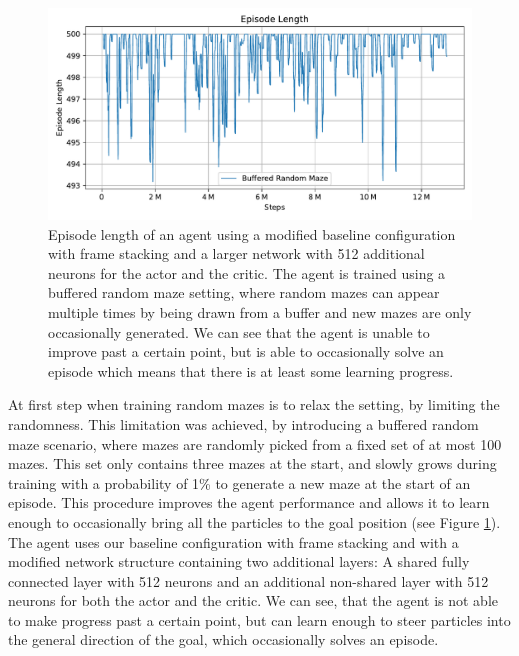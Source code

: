 \begin{figure}[htp]
    \begin{center}
        \includegraphics[clip, width=0.9\columnwidth]{figures/evaluation/randomness/instances/buffered_random_ep_len.pdf}
    \end{center}
    \caption[Episode Length on the Buffered Random Maze]{Episode length of an agent using a modified baseline configuration with frame stacking and a larger network with 512 additional neurons for the actor and the critic. The agent is trained using a buffered random maze setting, where random mazes can appear multiple times by being drawn from a buffer and new mazes are only occasionally generated. We can see that the agent is unable to improve past a certain point, but is able to occasionally solve an episode which means that there is at least some learning progress.} \label{fig:Eval/RandomInstance/Buffered}
\end{figure}

At first step when training random mazes is to relax the setting, by limiting the randomness. This limitation was achieved, by introducing a buffered random maze scenario, where mazes are randomly picked from a fixed set of at most 100 mazes. This set only contains three mazes at the start, and slowly grows during training with a probability of 1\% to generate a new maze at the start of an episode. This procedure improves the agent performance and allows it to learn enough to occasionally bring all the particles to the goal position (see Figure \ref{fig:Eval/RandomInstance/Buffered}). The agent uses our baseline configuration with frame stacking and with a modified network structure containing two additional layers: A shared fully connected layer with 512 neurons and an additional non-shared layer with 512 neurons for both the actor and the critic. We can see, that the agent is not able to make progress past a certain point, but can learn enough to steer particles into the general direction of the goal, which occasionally solves an episode.

